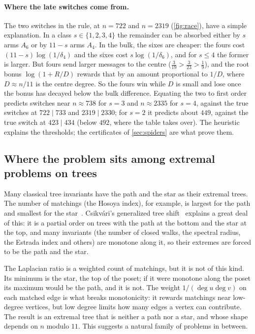\documentclass[11pt]{article}
\theoremstyle{definition}
\renewcommand{\deg}{\operatorname{deg}}
\begin{document}
\paragraph{Where the late switches come from.} The two switches in the rule, at $n=722$ and $n=2319$
(\cref{fig:race}), have a simple explanation. In a class $s\in\{1,2,3,4\}$ the remainder can be absorbed
either by $s$ arms $A_6$ or by $11-s$ arms $A_4$. In the bulk, the sixes are cheaper: the fours cost
$(11-s)\log(1/\delta_4)$ and the sixes cost $s\log(1/\delta_6)$, and for $s\le4$ the former is larger. But
fours send larger messages to the centre ($\tfrac3{19}>\tfrac3{23}>\tfrac19$), and the root bonus
$\log(1+R/D)$ rewards that by an amount proportional to $1/D$, where $D\approx n/11$ is the centre degree.
So the fours win while $D$ is small and lose once the bonus has decayed below the bulk difference. Equating
the two to first order predicts switches near $n\approx738$ for $s=3$ and $n\approx2335$ for $s=4$, against
the true switches at $722\mid733$ and $2319\mid2330$; for $s=2$ it predicts about $449$, against the true
switch at $423\mid434$ (below $492$, where the table takes over). The heuristic explains the thresholds;
the certificates of \cref{sec:spiders} are what prove them.

\subsection{Where the problem sits among extremal problems on trees}

Many classical tree invariants have the path and the star as their extremal trees. The number of
matchings (the Hosoya index), for example, is largest for the path and smallest for the
star~\cite{WagnerGutman2010}. Csikvári's generalized tree shift~\cite{Csikvari2010} explains a great deal of
this: it is a partial order on trees with the path at the bottom and the star at the top, and many
invariants (the number of closed walks, the spectral radius, the Estrada index and others) are monotone
along it, so their extremes are forced to be the path and the star.

The Laplacian ratio is a weighted count of matchings, but it is not of this kind. Its minimum is the
star, the top of the poset; if it were monotone along the poset its maximum would be the path, and it is
not. The weight $1/(\deg u\deg v)$ on each matched edge is what breaks monotonicity: it rewards matchings
near low-degree vertices, but low degree limits how many edges a vertex can contribute. The result is an
extremal tree that is neither a path nor a star, and whose shape depends on $n$ modulo $11$. This suggests
a natural family of problems in between.
\end{document}

